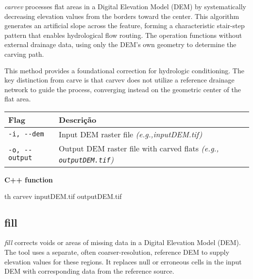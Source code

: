 \documentclass[
]{book}
\newenvironment{Shaded}{\begin{snugshade}}{\end{snugshade}}
\newcommand{\ExtensionTok}[1]{#1}
\newcommand{\NormalTok}[1]{#1}
\theoremstyle{definition}
\theoremstyle{definition}
\theoremstyle{definition}
\theoremstyle{definition}
\theoremstyle{remark}
\begin{document}
\emph{carvev} processes flat areas in a Digital Elevation Model (DEM) by systematically decreasing elevation values from the borders toward the center. This algorithm generates an artificial slope across the feature, forming a characteristic stair-step pattern that enables hydrological flow routing. The operation functions without external drainage data, using only the DEM's own geometry to determine the carving path.

This method provides a foundational correction for hydrologic conditioning. The key distinction from carve is that carvev does not utilize a reference drainage network to guide the process, converging instead on the geometric center of the flat area.

\begin{longtable}[]{@{}
  >{\raggedright\arraybackslash}p{}
  >{\raggedright\arraybackslash}p{}@{}}
\toprule\noalign{}
\begin{minipage}[b]{\linewidth}\raggedright
Flag
\end{minipage} & \begin{minipage}[b]{\linewidth}\raggedright
Descrição
\end{minipage} \\
\midrule\noalign{}
\endhead
\bottomrule\noalign{}
\endlastfoot
\texttt{-i,\ -\/-dem} & Input DEM raster file \emph{(e.g.,inputDEM.tif)} \\
\texttt{-o,\ -\/-output} & Output DEM raster file with carved flats \emph{(e.g., \texttt{outputDEM.tif})} \\
\end{longtable}

\textbf{C++ function}

\begin{Shaded}
\begin{Highlighting}[]
\ExtensionTok{th}\NormalTok{ carvev inputDEM.tif outputDEM.tif}
\end{Highlighting}
\end{Shaded}

\subsection{fill}\label{fill}

\emph{fill} corrects voids or areas of missing data in a Digital Elevation Model (DEM). The tool uses a separate, often coarser-resolution, reference DEM to supply elevation values for these regions. It replaces null or erroneous cells in the input DEM with corresponding data from the reference source.
\end{document}
